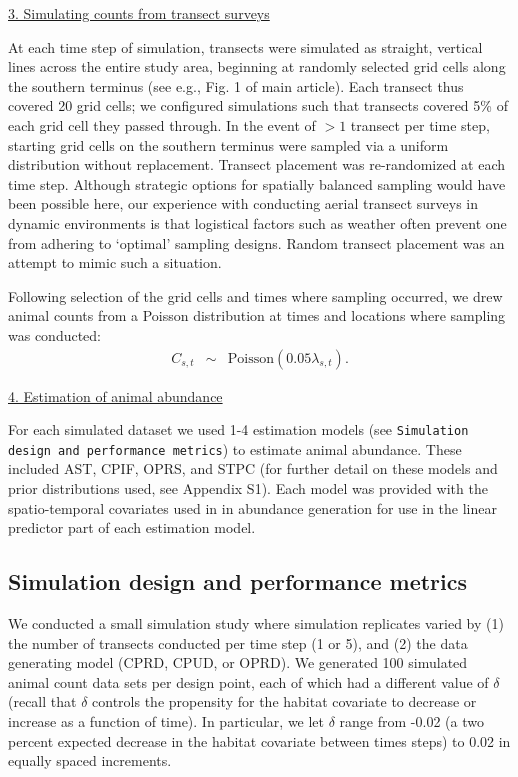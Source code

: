 \documentclass[12pt,fleqn]{article}
\begin{document}
\begin{flushleft}
\underline{3. Simulating counts from transect surveys}

At each time step of simulation, transects were simulated as straight, vertical lines across the entire study area, beginning at randomly selected grid cells along the southern terminus (see e.g., Fig. 1 of main article).  Each transect thus covered 20 grid cells; we configured simulations such that transects covered 5\% of each grid cell they passed through.  In the event of $>1$ transect per time step, starting grid cells on the southern terminus were sampled via a uniform distribution without replacement.  Transect placement was re-randomized at each time step.  Although strategic options for spatially balanced sampling would have been possible here, our experience with conducting aerial transect surveys in dynamic environments is that logistical factors such as weather often prevent one from adhering to `optimal' sampling designs.  Random transect placement was an attempt to mimic such a situation.



Following selection of the grid cells and times where sampling occurred, we drew animal counts from a Poisson distribution at times and locations where sampling was conducted:
\begin{eqnarray*}
  C_{s,t} & \sim & \text{Poisson}(0.05 \lambda_{s,t}).
\end{eqnarray*}

\underline{4. Estimation of animal abundance}

For each simulated dataset we used 1-4 estimation models (see \texttt{Simulation design and performance metrics}) to estimate animal abundance.  These included AST, CPIF, OPRS, and STPC (for further detail on these models and prior distributions used, see Appendix S1).  Each model was provided with the spatio-temporal covariates used in in abundance generation for use in the linear predictor part of each estimation model.

\subsection{Simulation design and performance metrics}

We conducted a small simulation study where simulation replicates varied by (1) the number of transects conducted per time step (1 or 5), and (2) the data generating model (CPRD, CPUD, or OPRD).  We generated 100 simulated animal count data sets per design point, each of which had a different value of $\delta$ (recall that $\delta$ controls the propensity for the habitat covariate to decrease or increase as a function of time).  In particular, we let $\delta$ range from -0.02 (a two percent expected decrease in the habitat covariate between times steps) to 0.02 in equally spaced increments.


\end{flushleft}
\end{document}
